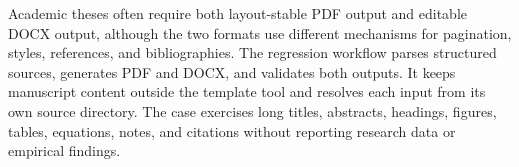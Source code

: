 \begin{enabstract}
Academic theses often require both layout-stable PDF output and editable DOCX
output, although the two formats use different mechanisms for pagination,
styles, references, and bibliographies. The regression workflow parses
structured sources, generates PDF and DOCX, and validates both outputs. It
keeps manuscript content outside the template tool and resolves each input
from its own source directory. The case
exercises long titles, abstracts, headings, figures, tables, equations, notes,
and citations without reporting research data or empirical findings.

\end{enabstract}
